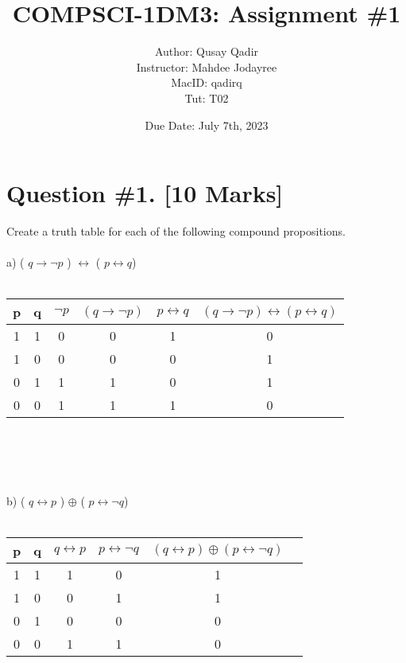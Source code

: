 \documentclass{article}
\title{
\LARGE COMPSCI-1DM3: Assignment \#1 \\
}
\author{\Large Author: Qusay Qadir \\
\large Instructor: Mahdee Jodayree \\ MacID: qadirq \\Tut: T02 \\ }
\date{Due Date: July 7th, 2023}
\begin{document}
\maketitle
\newpage
\tableofcontents
\newpage
\section{Question \#1. [10 Marks]}
Create a truth table for each of the following compound propositions. \\ \\ 
a) ( $q \rightarrow \neg p$ )  $\leftrightarrow$ ( $p \leftrightarrow q$) \\ \\
\begin{table}[h]
\centering
\begin{tabular}{cccccc}
\hline
p & q & $\neg p$ & $(q \rightarrow \neg p)$ & $p \leftrightarrow q$ & $(q \rightarrow \neg p) \leftrightarrow (p \leftrightarrow q)$ \\ 
\hline
1 & 1 & 0 & 0 & 1 & 0 \\
1 & 0 & 0 & 0 & 0 & 1 \\
0 & 1 & 1 & 1 & 0 & 1 \\
0 & 0 & 1 & 1 & 1 & 0 \\
\hline
\end{tabular}
\end{table}
\\ \\ \\ \\ 

b)  ( $q \leftrightarrow p$ )  $\oplus$ ( $p \leftrightarrow \neg q$) \\ \\ 
\begin{table}[h]
\centering
\begin{tabular}{cccccc}
\hline
p & q & $q \leftrightarrow p$ & $p \leftrightarrow \neg q$ & $(q \leftrightarrow p) \oplus (p \leftrightarrow \neg q)$ \\
\hline
1 & 1 & 1  & 0 & 1 \\
1 & 0 & 0 & 1 & 1 \\
0 & 1 & 0 & 0 & 0 \\
0 & 0 & 1 & 1 & 0 \\
\hline
\end{tabular}
\end{table}

\newpage
\end{document}
